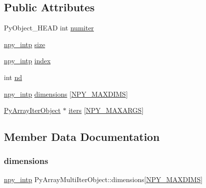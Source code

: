 \subsection*{Public Attributes}
\begin{DoxyCompactItemize}
\item 
Py\+Object\+\_\+\+H\+E\+AD int \hyperlink{structPyArrayMultiIterObject_a936318911a75d975b1cd15d494229ba3}{numiter}
\item 
\hyperlink{npy__common_8h_a2d6effc4d5ecb85675ebfcfaa102b483}{npy\+\_\+intp} \hyperlink{structPyArrayMultiIterObject_a9ad3ab17355bcd13c90fadaab1a21c8b}{size}
\item 
\hyperlink{npy__common_8h_a2d6effc4d5ecb85675ebfcfaa102b483}{npy\+\_\+intp} \hyperlink{structPyArrayMultiIterObject_a37883aa22d39100613d9bdaba7175da4}{index}
\item 
int \hyperlink{structPyArrayMultiIterObject_af68cc4321b0df114616f679b9b67c43a}{nd}
\item 
\hyperlink{npy__common_8h_a2d6effc4d5ecb85675ebfcfaa102b483}{npy\+\_\+intp} \hyperlink{structPyArrayMultiIterObject_a22cf3c3607246332faacba98d5813c16}{dimensions} \mbox{[}\hyperlink{ndarraytypes_8h_a737679ea9ee902bfa707c146051c17b5}{N\+P\+Y\+\_\+\+M\+A\+X\+D\+I\+MS}\mbox{]}
\item 
\hyperlink{ndarraytypes_8h_ab11d6835958704afe8bb5a5f5df21aab}{Py\+Array\+Iter\+Object} $\ast$ \hyperlink{structPyArrayMultiIterObject_a6337663dd3870ef4efd0d2f102c2f060}{iters} \mbox{[}\hyperlink{ndarraytypes_8h_a001b5a5cffb1e85728a176fed1180683}{N\+P\+Y\+\_\+\+M\+A\+X\+A\+R\+GS}\mbox{]}
\end{DoxyCompactItemize}


\subsection{Member Data Documentation}
\mbox{\label{structPyArrayMultiIterObject_a22cf3c3607246332faacba98d5813c16}} 
\subsubsection{\texorpdfstring{dimensions}{dimensions}}
{\footnotesize\ttfamily \hyperlink{npy__common_8h_a2d6effc4d5ecb85675ebfcfaa102b483}{npy\+\_\+intp} Py\+Array\+Multi\+Iter\+Object\+::dimensions\mbox{[}\hyperlink{ndarraytypes_8h_a737679ea9ee902bfa707c146051c17b5}{N\+P\+Y\+\_\+\+M\+A\+X\+D\+I\+MS}\mbox{]}}

